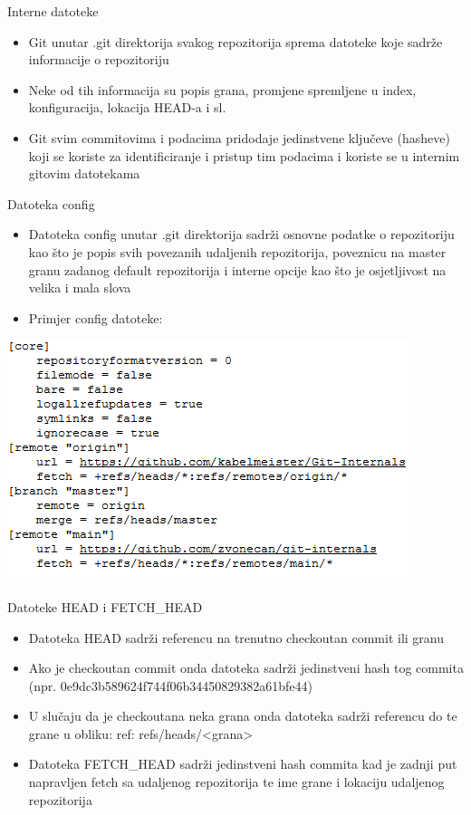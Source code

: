 \begin{frame}{Interne datoteke}
	\begin{itemize}
		\item{Git unutar .git direktorija svakog repozitorija sprema datoteke koje sadrže informacije o repozitoriju}
		\item{Neke od tih informacija su popis grana, promjene spremljene u index, konfiguracija, lokacija HEAD-a i sl.}
		\item{Git svim commitovima i podacima pridodaje jedinstvene ključeve (hasheve) koji se koriste za identificiranje i pristup tim podacima i koriste se u internim gitovim datotekama}
	\end{itemize}
\end{frame}
\begin{frame}{Datoteka config}
	\begin{itemize}
		\item{Datoteka config unutar .git direktorija sadrži osnovne podatke o repozitoriju kao što je popis svih povezanih udaljenih repozitorija, poveznicu na master granu zadanog default repozitorija i interne opcije kao što je osjetljivost na velika i mala slova}
		\item{Primjer config datoteke:}
	\end{itemize}
	\begin{center}
		\includegraphics[width=0.66\linewidth]{img/config.png}
	\end{center}
\end{frame}
\begin{frame}{Datoteke HEAD i FETCH\_HEAD}
	\begin{itemize}
		\item{Datoteka HEAD sadrži referencu na trenutno checkoutan commit ili granu}
		\item{Ako je checkoutan commit onda datoteka sadrži jedinstveni hash tog commita (npr. 0e9dc3b589624f744f06b34450829382a61bfe44)}
		\item{U slučaju da je checkoutana neka grana onda datoteka sadrži referencu do te grane u obliku: ref: refs/heads/<grana>}
		\item{Datoteka FETCH\_HEAD sadrži jedinstveni hash commita kad je zadnji put napravljen fetch sa udaljenog repozitorija te ime grane i lokaciju udaljenog repozitorija}
	\end{itemize}
\end{frame}
